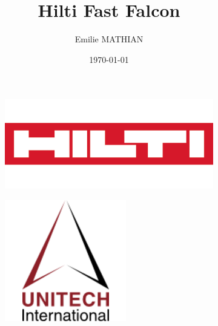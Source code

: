 \documentclass[12pt, french, a4paper]{article} %
\title{Hilti Fast Falcon }	%
\author{ Emilie MATHIAN}
\date{\today}
\begin{document}
	\begin{titlepage}
	\begin{figure}[H]
		\vspace{-2cm}
 \centering

 \begin{subfigure}{0.3\textwidth}
  \includegraphics[width=1.3\linewidth]{figure/pngwing.com.png}
 \end{subfigure}
 \hspace{6cm}
  \begin{subfigure}{0.3\textwidth}
  \includegraphics[width=0.8\linewidth]{figure/Unitech.png}
  \label{app_view_echec}
 \end{subfigure}
\end{figure}%





\end{titlepage}
\end{document}

